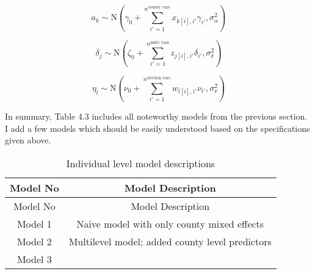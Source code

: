 \documentclass[12pt,twoside]{reedthesis}
\begin{document}
  \[a_{k} \sim \text{N}(\gamma_0 + \sum_{i'=1}^{n^{\text{county vars}}}x_{k[i], i'}\gamma_{i'}, \sigma_{\alpha}^2)\]
  
  \[\delta_{j} \sim \text{N}(\zeta_0 + \sum_{i'=1}^{n^{\text{indiv vars}}}z_{j[i], i'}\delta_{i'}, \sigma_{\delta}^2)\]
  
  \[\eta_{l} \sim \text{N}(\nu_0 + \sum_{i'=1}^{n^{\text{election vars}}}w_{l[i], i'}\nu_{i'}, \sigma_{\nu}^2)\]
  
  In summary, Table 4.3 includes all noteworthy models from the previous
  section. I add a few models which should be easily understood based on
  the specifications given above.
  
  \begin{longtable}[]{@{}cc@{}}
  \caption{Individual level model descriptions
  \label{tab:model_desc_individual}}\tabularnewline
  \toprule
  \begin{minipage}[b]{0.15\columnwidth}\centering\strut
  Model No\strut
  \end{minipage} & \begin{minipage}[b]{0.80\columnwidth}\centering\strut
  Model Description\strut
  \end{minipage}\tabularnewline
  \midrule
  \endfirsthead
  \toprule
  \begin{minipage}[b]{0.15\columnwidth}\centering\strut
  Model No\strut
  \end{minipage} & \begin{minipage}[b]{0.80\columnwidth}\centering\strut
  Model Description\strut
  \end{minipage}\tabularnewline
  \midrule
  \endhead
  \begin{minipage}[t]{0.15\columnwidth}\centering\strut
  Model 1\strut
  \end{minipage} & \begin{minipage}[t]{0.80\columnwidth}\centering\strut
  Naive model with only county mixed effects\strut
  \end{minipage}\tabularnewline
  \begin{minipage}[t]{0.15\columnwidth}\centering\strut
  Model 2\strut
  \end{minipage} & \begin{minipage}[t]{0.80\columnwidth}\centering\strut
  Multilevel model; added county level predictors\strut
  \end{minipage}\tabularnewline
  \begin{minipage}[t]{0.15\columnwidth}\centering\strut
  Model 3\strut
  \end{minipage} & \begin{minipage}[t]{0.80\columnwidth}\centering\strut

\end{minipage}
\end{longtable}
\end{document}
